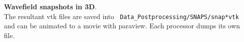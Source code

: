 \documentclass[11pt,letter,fleqn,english,notitlepage]{article}
\begin{document}
\noindent \textbf{Wavefield snapshots in 3D}.\\
The resultant vtk files are saved into {\tt
Data\_Postprocessing/SNAPS/snap*vtk} and can be animated to a movie with
paraview. Each processor dumps its own file.\\
% 
% 
% 


\end{document}
